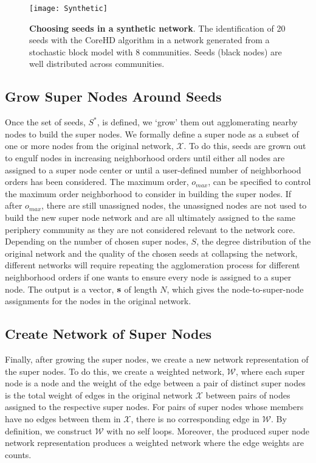 \begin{figure}
\centering
\texttt{[image: Synthetic]}
\caption{{\bf Choosing seeds in a synthetic network}. The identification of 20 seeds with the CoreHD algorithm in a network generated from a stochastic block model with 8 communities. Seeds (black nodes) are well distributed across communities.}
\label{Synth}
\end{figure}

\subsection{Grow Super Nodes Around Seeds}
Once the set of seeds, $S^{*}$, is defined, we `grow' them out  agglomerating nearby nodes to build the super nodes. We formally define a super node as a subset of one or more nodes from the original network, ${\mathcal X}$. To do this, seeds are grown out to engulf nodes in increasing neighborhood orders until either all nodes are assigned to a super node center or until a user-defined number of neighborhood orders has been considered. The maximum order, $o_{max}$, can be specified to control the maximum order neighborhood to consider in building the super nodes. If after $o_{max}$, there are still unassigned nodes, the unassigned nodes are not used to build the new super node network and are all ultimately assigned to the same periphery community as they are not considered relevant to the network core.  Depending on the number of chosen super nodes, $S$, the degree distribution of the original network and the quality of the chosen seeds at collapsing the network, different networks will require repeating the agglomeration process for different neighborhood orders if one wants to ensure every node is assigned to a super node.  %
The output is a vector, ${\bf s}$ of length $N$, which gives the node-to-super-node assignments for the nodes in the original network. 

\subsection{Create Network of Super Nodes}
Finally, after growing the super nodes, we create a new network representation of the super nodes. To do this, we create a weighted network, $\mathcal{W}$, where each super node is a node and the weight of the edge between a pair of distinct super nodes is the total weight of edges in the original network ${\mathcal X}$ between pairs of nodes assigned to the respective  super nodes. For pairs of super nodes whose members have no edges between them in ${\mathcal X}$, there is no corresponding edge in ${\mathcal W}$. By definition, we construct ${\mathcal W}$ with no self loops. Moreover, the produced super node network representation produces a weighted network where the edge weights are counts. 

